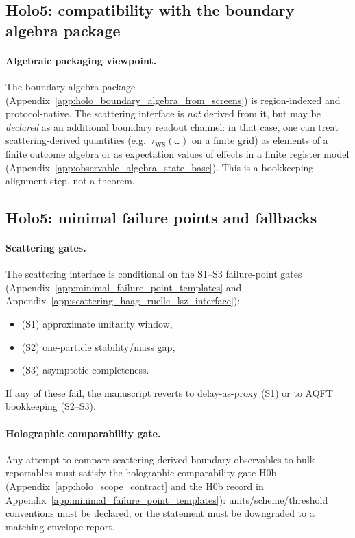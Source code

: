 \subsection{Holo5: compatibility with the boundary algebra package}
\label{subsec:holo5_boundary_algebra_compatibility}

\paragraph{Algebraic packaging viewpoint.}
\AuditTag The boundary-algebra package (Appendix~\ref{app:holo_boundary_algebra_from_screens}) is region-indexed and protocol-native.
The scattering interface is \emph{not} derived from it, but may be \emph{declared} as an additional boundary readout channel:
in that case, one can treat scattering-derived quantities (e.g.\ $\tau_{\mathrm{WS}}(\omega)$ on a finite grid) as elements of a finite outcome algebra
or as expectation values of effects in a finite register model (Appendix~\ref{app:observable_algebra_state_base}).
This is a bookkeeping alignment step, not a theorem.

\subsection{Holo5: minimal failure points and fallbacks}
\label{subsec:holo5_failure_points}

\paragraph{Scattering gates.}
\AuditTag The scattering interface is conditional on the S1--S3 failure-point gates
(Appendix~\ref{app:minimal_failure_point_templates} and Appendix~\ref{app:scattering_haag_ruelle_lsz_interface}):
\begin{itemize}
\item (S1) approximate unitarity window,
\item (S2) one-particle stability/mass gap,
\item (S3) asymptotic completeness.
\end{itemize}
If any of these fail, the manuscript reverts to delay-as-proxy (S1) or to AQFT bookkeeping (S2--S3).

\paragraph{Holographic comparability gate.}
\AuditTag Any attempt to compare scattering-derived boundary observables to bulk reportables must satisfy the holographic comparability gate H0b
(Appendix~\ref{app:holo_scope_contract} and the H0b record in Appendix~\ref{app:minimal_failure_point_templates}):
units/scheme/threshold conventions must be declared, or the statement must be downgraded to a matching-envelope report.


